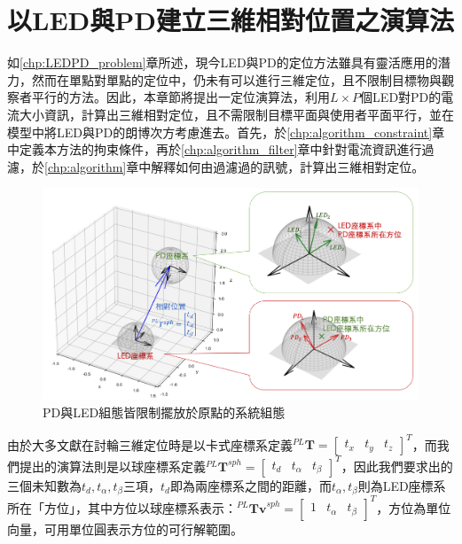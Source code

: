 \chapter{以LED與PD建立三維相對位置之演算法}
\label{chp:3}

如\ref{chp:LEDPD_problem}章所述，現今LED與PD的定位方法雖具有靈活應用的潛力，然而在單點對單點的定位中，仍未有可以進行三維定位，且不限制目標物與觀察者平行的方法。因此，本章節將提出一定位演算法，利用$L\times P$個LED對PD的電流大小資訊，計算出三維相對定位，且不需限制目標平面與使用者平面平行，並在模型中將LED與PD的朗博次方考慮進去。首先，於\ref{chp:algorithm_constraint}章中定義本方法的拘束條件，再於\ref{chp:algorithm_filter}章中針對電流資訊進行過濾，於\ref{chp:algorithm}章中解釋如何由過濾過的訊號，計算出三維相對定位。


\begin{figure}[h]
    \centering
    \includegraphics[width=14cm]{ch3pic/algorithm_place.png}
    \caption{PD與LED組態皆限制擺放於原點的系統組態}
    \label{pic:algorithm_coor}
\end{figure}

由於大多文獻在討輪三維定位時是以卡式座標系定義$^{PL}\boldsymbol{T}=\left[\begin{array}{ccc}t_x&t_y&t_z\end{array}\right]^T$，而我們提出的演算法則是以球座標系定義$^{PL}\boldsymbol{T}^{sph}=\left[\begin{array}{ccc}t_d&t_{\alpha}&t_{\beta}\end{array}\right]^T$，因此我們要求出的三個未知數為$t_d,t_\alpha,t_\beta$三項，$t_d$即為兩座標系之間的距離，而$t_{\alpha},t_{\beta}$則為LED座標系所在「方位」，其中方位以球座標系表示：$^{PL}\boldsymbol{Tv}^{sph} = \left[\begin{array}{ccc}1&t_{\alpha}&t_{\beta}\end{array}\right]^T$，方位為單位向量，可用單位圓表示方位的可行解範圍。








